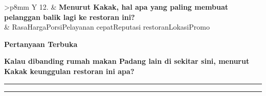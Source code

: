 \documentclass[11pt,a4paper]{article}
\newcommand{\sectionbar}[1]{%
  \Needspace{4\baselineskip}
  \vspace{5mm}
  \noindent\colorbox{Soft}{%
    \parbox{\dimexpr\linewidth-2\fboxsep\relax}{%
      \large\bfseries\textcolor{Primary}{#1}
    }%
  }\par\vspace{2mm}
}
\newcommand{\choice}{\raisebox{0.15ex}{\fbox{\rule{0pt}{1.05ex}\rule{1.05ex}{0pt}}}\hspace{0.5mm}}
\newcommand{\choiceitem}[1]{\choice #1}
\newcommand{\questionblock}[3]{%
  \Needspace{7\baselineskip}
  \noindent
  \begin{tabularx}{\linewidth}{>{\bfseries\color{Primary}}p{8mm} Y}
    #1 & \textbf{#2}\\
       & {\small\textcolor{TextGray}{#3}}\\
  \end{tabularx}
  \par\vspace{2.4mm}
}
\newcommand{\answerline}{%
  \par\vspace{1mm}
  \noindent\textcolor{LineGray}{\rule{\linewidth}{0.35pt}}\par\vspace{4mm}
}
\begin{document}
\questionblock{12.}{Menurut Kakak, hal apa yang paling membuat pelanggan balik lagi ke restoran ini?}{\choiceitem{Rasa}\quad \choiceitem{Harga}\quad \choiceitem{Porsi}\quad \choiceitem{Pelayanan cepat}\quad \choiceitem{Reputasi restoran}\quad \choiceitem{Lokasi}\quad \choiceitem{Promo}}

\sectionbar{Pertanyaan Terbuka}
\textbf{Kalau dibanding rumah makan Padang lain di sekitar sini, menurut Kakak keunggulan restoran ini apa?}
\answerline
\answerline
\end{document}
